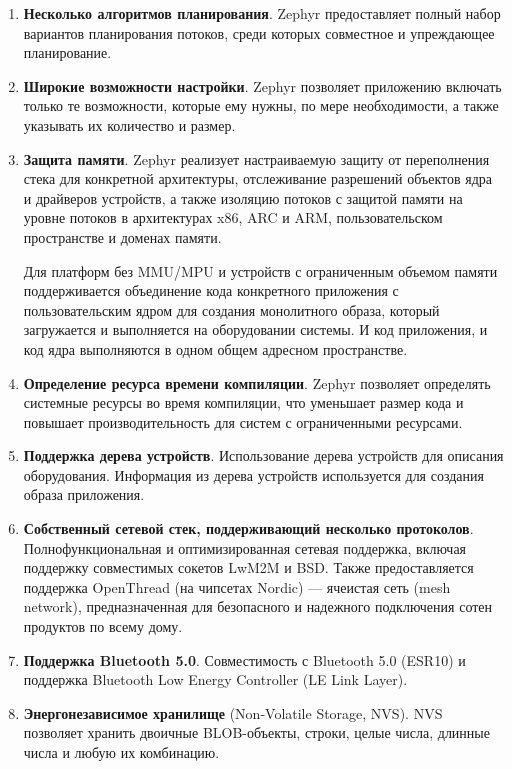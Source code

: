 \begin{enumerate}[label*=\arabic*.]
	\item \textbf{Несколько алгоритмов планирования}. \newline
	Zephyr предоставляет полный набор вариантов планирования потоков, среди которых совместное и упреждающее планирование.
	
	\item \textbf{Широкие возможности настройки}. \newline
	Zephyr позволяет приложению включать только те возможности, которые ему нужны, по мере необходимости, а также указывать их количество и размер.
	
	\item \textbf{Защита памяти}. \newline
	Zephyr реализует настраиваемую защиту от переполнения стека для конкретной архитектуры, отслеживание разрешений объектов ядра и драйверов устройств, а также изоляцию потоков с защитой памяти на уровне потоков в архитектурах x86, ARC и ARM, пользовательском пространстве и доменах памяти.
	
	Для платформ без MMU/MPU и устройств с ограниченным объемом памяти поддерживается объединение кода конкретного приложения с пользовательским ядром для создания монолитного образа, который загружается и выполняется на оборудовании системы. И код приложения, и код ядра выполняются в одном общем адресном пространстве.
	
	\item \textbf{Определение ресурса времени компиляции}. \newline
	Zephyr позволяет определять системные ресурсы во время компиляции, что уменьшает размер кода и повышает производительность для систем с ограниченными ресурсами.
	
	\item \textbf{Поддержка дерева устройств}. \newline
	Использование дерева устройств \cite{Zephyr_device_tree} для описания оборудования. Информация из дерева устройств используется для создания образа приложения.
	
	\item \textbf{Собственный сетевой стек, поддерживающий несколько протоколов}. \newline
	Полнофункциональная и оптимизированная сетевая поддержка, включая поддержку совместимых сокетов LwM2M и BSD. Также предоставляется поддержка OpenThread (на чипсетах Nordic) — ячеистая сеть (mesh network), предназначенная для безопасного и надежного подключения сотен продуктов по всему дому.
	
	\item \textbf{Поддержка Bluetooth 5.0}. \newline
	Совместимость с Bluetooth 5.0 (ESR10) и поддержка Bluetooth Low Energy Controller (LE Link Layer).
	
	\item \textbf{Энергонезависимое хранилище} (Non-Volatile Storage, NVS). \newline
	NVS позволяет хранить двоичные BLOB-объекты, строки, целые числа, длинные числа и любую их комбинацию.
	
\end{enumerate}
